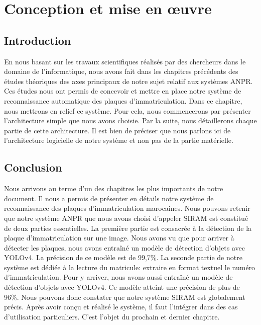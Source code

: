 \chapter{\textbf{Conception et mise en œuvre}}
    \section{Introduction}
    En nous basant sur les travaux scientifiques réalisés par des chercheurs dans le domaine de l'informatique, nous avons fait dans les chapitres précédents des études théoriques des axes principaux de notre sujet relatif aux systèmes ANPR. Ces études nous ont permis de concevoir et mettre en place notre système de reconnaissance automatique des plaques d'immatriculation. Dans ce chapitre, nous mettrons en relief ce système. Pour cela, nous commencerons par présenter l'architecture simple que nous avons choisie. Par la suite, nous détaillerons chaque partie de cette architecture. Il est bien de préciser que nous parlons ici de l'architecture logicielle de notre système et non pas de la partie matérielle.
    
    
    
    

    \section{Conclusion}
    Nous arrivons au terme d’un des chapitres les plus importants de notre document. Il  nous a permis de présenter en détails notre système de reconnaissance des plaques d’immatriculation marocaines. Nous pouvons retenir que notre système ANPR que nous avons choisi d’appeler SIRAM est constitué de deux parties essentielles. La première partie est consacrée à la détection de la plaque d’immatriculation sur une image. Nous avons vu que pour arriver à détecter les plaques, nous avons entraîné un modèle de détection d’objets avec YOLOv4. La précision de ce modèle est de 99,7\%. La seconde partie de notre système est dédiée à la lecture du matricule: extraire en format textuel le numéro d’immatriculation. Pour y arriver, nous avons aussi entraîné un modèle de détection d’objets avec YOLOv4. Ce modèle atteint une précision de plus de 96\%. Nous pouvons donc constater que notre système SIRAM est globalement précis. Après avoir conçu et réalisé le système, il faut l’intégrer dans des cas d’utilisation particuliers. C’est l’objet du prochain et dernier chapitre.